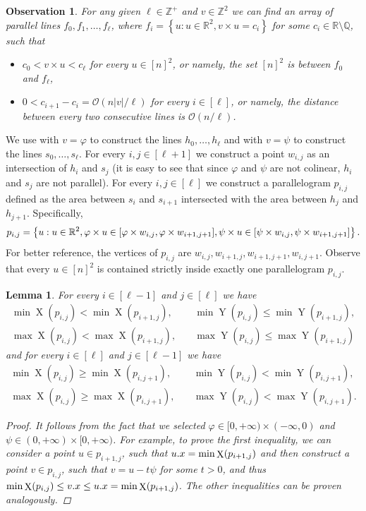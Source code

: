 \documentclass[11pt]{article}
\newcommand{\R}{\mathbb{R}}
\newcommand{\Z}{\mathbb{Z}}
\renewcommand{\O}{\mathcal{O}}
\renewcommand{\phi}{\varphi}
\newcommand{\set}[1]{\left\lbrace #1 \right\rbrace}
\newcommand{\eq}[1]{\begin{align*} #1 \end{align*}}
\theoremstyle{plain}
\newtheorem{lemma}{Lemma}
\newtheorem{observation}{Observation}
\theoremstyle{definition}
\theoremstyle{remark}
\DeclareMathOperator*{\X}{X}
\DeclareMathOperator*{\Y}{Y}
\begin{document}
\newcommand{\IQ}{\mathbb{R} \setminus \mathbb{Q}}
\begin{observation}\label{line_existence}
	For any given $\ell \in \Z^+$ and $v \in \Z^2$ we can find an array of parallel lines $f_0, f_1, \dots, f_\ell$, where $f_i = \set{u : u \in \R^2, v \times u = c_i}$ for some $c_i \in \IQ$, such that
	\begin{itemize}
		\item $c_0 < v \times u < c_\ell$ for every $u \in [n]^2$, or namely, the set $[n]^2$ is between $f_0$ and $f_\ell$,
		\item $0 < c_{i + 1} - c_i = \O(n|v| / \ell)$ for every $i \in [\ell]$, or namely, the distance between every two consecutive lines is $\O(n / \ell)$.
	\end{itemize}
\end{observation}

We use  with $v = \phi$ to construct the lines $h_0, \dots, h_\ell$ and with $v = \psi$ to construct the lines $s_0, \dots, s_\ell$.
For every $i, j \in [\ell + 1]$ we construct a point $w_{i, j}$ as an intersection of $h_i$ and $s_j$ (it is easy to see that since $\phi$ and $\psi$ are not colinear, $h_i$ and $s_j$ are not parallel).
For every $i, j \in [\ell]$ we construct a parallelogram $p_{i, j}$ defined as the area between $s_i$ and $s_{i + 1}$ intersected with the area between $h_j$ and $h_{j + 1}$.
Specifically,
\[p_{i, j} = \set{u : u \in \R^2, \h{u} \in [\h{w_{i, j}}, \h{w_{i + 1, j + 1}}], \s{u} \in [\s{w_{i, j}}, \s{w_{i + 1, j + 1}}]}.\]
For better reference, the vertices of $p_{i, j}$ are $w_{i, j}, w_{i + 1, j}, w_{i + 1, j + 1}, w_{i, j + 1}$.
Observe that every $u \in [n]^2$ is contained strictly inside exactly one parallelogram $p_{i, j}$.

\begin{lemma}\label{monotonicity_lemma}
	For every $i \in [\ell - 1]$ and $j \in [\ell]$ we have
	\eq{
	\min \X(p_{i, j}) < \min \X(p_{i + 1, j}), \quad
	&\min \Y(p_{i, j}) \le \min \Y(p_{i + 1, j}), \\
	\max \X(p_{i, j}) < \max \X(p_{i + 1, j}), \quad
	&\max \Y(p_{i, j}) \le \max \Y(p_{i + 1, j})
	}
	and for every $i \in [\ell]$ and $j \in [\ell - 1]$ we have
	\eq{
		\min \X(p_{i, j}) \ge \min \X(p_{i, j + 1}), \quad
		&\min \Y(p_{i, j}) < \min \Y(p_{i, j + 1}), \\
		\max \X(p_{i, j}) \ge \max \X(p_{i, j + 1}), \quad
		&\max \Y(p_{i, j}) < \max \Y(p_{i, j + 1}).
	}
	\begin{proof}
		It follows from the fact that we selected $\phi \in [0, +\infty) \times (-\infty, 0)$ and $\psi \in (0, +\infty) \times [0, +\infty)$.
		For example, to prove the first inequality, we can consider a point $u \in p_{i + 1, j}$, such that $\x{u} = \min \X(p_{i + 1, j})$
		and then construct a point $v \in p_{i, j}$, such that $v = u - t\psi$ for some $t > 0$, and thus $\min \X(p_{i, j}) \le \x{v} \le \x{u} = \min \X(p_{i + 1, j})$.
		The other inequalities can be proven analogously.
	\end{proof}
\end{lemma}
\end{document}
